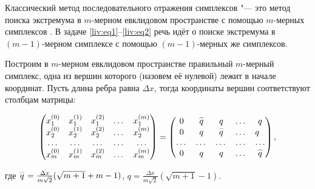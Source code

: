 Классический метод последовательного отражения симплексов "--- это метод поиска экстремума в $m$-мерном евклидовом пространстве с помощью $m$-мерных симплексов \cite{liv:bib:18}. В задаче \eqref{liv:eq1}--\eqref{liv:eq2} речь идёт о поиске экстремума в $(m-1)$-мерном симплексе с помощью $(m-1)$-мерных же симплексов.



Построим в $m$-мерном евклидовом пространстве правильный $m$-мерный симплекс, одна из вершин которого (назовем её нулевой) лежит в начале координат. Пусть длина ребра равна $\Delta x$, тогда координаты вершин соответствуют столбцам матрицы:

$$

\begin{pmatrix}

x_1^{(0)} & x_1^{(1)} & x_1^{(2)} & \dots & x_1^{(m)} \\

x_2^{(0)} & x_2^{(1)} & x_2^{(2)} & \dots & x_2^{(m)} \\

\dots & \dots & \dots & \dots & \dots \\

x_m^{(0)} & x_m^{(1)} & x_m^{(2)} & \dots & x_m^{(m)}

\end{pmatrix}

= 

\begin{pmatrix}

0 & 

\mathord{\buildrel{\lower3pt\hbox{$\scriptscriptstyle\frown$}}\over {q}} & q & \dots & q \\

0 & q & \mathord{\buildrel{\lower3pt\hbox{$\scriptscriptstyle\frown$}}\over {q}} & \dots & q \hfill \\

\dots & \dots & \dots & \dots & \dots \\

0 & q & q & \dots & \mathord{\buildrel{\lower3pt\hbox{$\scriptscriptstyle\frown$}}\over {q}} 

\end{pmatrix},

$$

где $\mathord{\buildrel{\lower3pt\hbox{$\scriptscriptstyle\frown$}}\over{q}}=\frac{\Delta x}{m\sqrt2}(\sqrt{m+1}+m-1)$, $q=\frac{\Delta x}{m\sqrt2}(\sqrt{m+1}-1)$.




